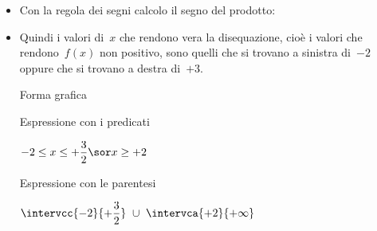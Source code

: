 \begin{esempio}
\begin{itemize}
 \item
 \vspace{-1em}
 Con la regola dei segni calcolo il segno del prodotto:
 \vspace{-1em}

\begin{inaccessibleblock}
  \begin{center}
  \segnoprodottoa
  \end{center}
\end{inaccessibleblock}

 \item
 \vspace{-1em}
 Quindi i valori di~\(x\) che rendono vera la disequazione, cioè i
valori che rendono~\(f(x)\) non positivo, sono quelli
che si trovano a sinistra di~\(-2\) oppure che si trovano a destra
di~\(+3\).\\

  \begin{minipage}{.32\textwidth}
  Forma grafica\\[-1.2em]

\begin{inaccessibleblock}
  \begin{center}
  \solprodottoa
  \end{center}
\end{inaccessibleblock}
\vspace{.1em}

  \end{minipage}
  \begin{minipage}{.32\textwidth}
  Espressione con i predicati\\[-.3em]

 \begin{center}
  \(-2 \le x \le +\dfrac{3}{2} \sor x \ge +2\)
  \vspace{1em}
 \end{center}
  \end{minipage}
  \begin{minipage}{.32\textwidth}
  Espressione con le parentesi\\[-.3em]

 \begin{center}
  \(\intervcc{-2}{+\dfrac{3}{2}}~\cup~\intervca{+2}{+\infty}\)
  \vspace{.8em}
 \end{center}
  \end{minipage}

\end{itemize}

\end{esempio}

